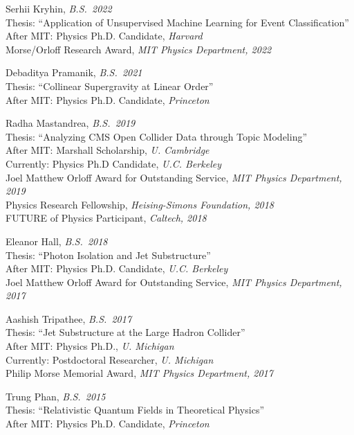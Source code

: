 \bbl

\item Serhii Kryhin, \emph{B.S.~2022}
\\ Thesis: ``Application of Unsupervised Machine Learning for Event Classification''
\\ After MIT: Physics Ph.D. Candidate, \emph{Harvard}
\\ Morse/Orloff Research Award, \emph{MIT Physics Department, 2022}

\item Debaditya Pramanik, \emph{B.S.~2021}
\\ Thesis: ``Collinear Supergravity at Linear Order''
\\ After MIT: Physics Ph.D. Candidate, \emph{Princeton}

\item Radha Mastandrea, \emph{B.S.~2019}
\\ Thesis: ``Analyzing CMS Open Collider Data through Topic Modeling''
\\ After MIT: Marshall Scholarship, \emph{U. Cambridge}
\\ Currently: Physics Ph.D Candidate, \emph{U.C. Berkeley}
\\ Joel Matthew Orloff Award for Outstanding Service, \emph{MIT Physics Department, 2019}
\\ Physics Research Fellowship, \emph{Heising-Simons Foundation, 2018}
\\ FUTURE of Physics Participant, \emph{Caltech, 2018}

\item Eleanor Hall, \emph{B.S.~2018}
\\ Thesis: ``Photon Isolation and Jet Substructure''
\\ After MIT: Physics Ph.D. Candidate, \emph{U.C. Berkeley}
\\ Joel Matthew Orloff Award for Outstanding Service, \emph{MIT Physics Department, 2017}

\item Aashish Tripathee, \emph{B.S.~2017}
\\ Thesis: ``Jet Substructure at the Large Hadron Collider''
\\ After MIT: Physics Ph.D., \emph{U. Michigan}
\\ Currently: Postdoctoral Researcher, \emph{U. Michigan}
\\ Philip Morse Memorial Award, \emph{MIT Physics Department, 2017}

\item Trung Phan, \emph{B.S.~2015}
\\ Thesis: ``Relativistic Quantum Fields in Theoretical Physics''
\\ After MIT: Physics Ph.D. Candidate, \emph{Princeton}

